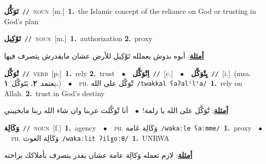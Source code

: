 \documentclass[10pt,a4paper,twoside]{article} %
\begin{document}
\begin{multicols}{2}
{\setlength\topsep{0pt}\textbf{\foreignlanguage{arabic}{تَوَكُّل}}\ {\color{gray}\texttt{//}\color{black}}\ \textsc{noun}\ [m.]\ \textbf{1.}~the Islamic concept of the reliance on God or trusting in God's plan\ } \vspace{2mm}

{\setlength\topsep{0pt}\textbf{\foreignlanguage{arabic}{تَوْكِيل}}\ {\color{gray}\texttt{//}\color{black}}\ \textsc{noun}\ [m.]\ \textbf{1.}~authorization  \textbf{2.}~proxy\  \begin{flushright}\color{gray}\foreignlanguage{arabic}{\textbf{\underline{\foreignlanguage{arabic}{أمثلة}}}: أبوه  بدوش يعملله تَوْكِيل للأرض عشان مايقدرش يتصرف فيها}\end{flushright}\color{black}} \vspace{2mm}

{\setlength\topsep{0pt}\textbf{\foreignlanguage{arabic}{تْوَكَّل}}\ {\color{gray}\texttt{//}\color{black}}\ \textsc{verb}\ [p.]\ \textbf{1.}~rely  \textbf{2.}~trust\ \ $\bullet$\ \ \setlength\topsep{0pt}\textbf{\foreignlanguage{arabic}{اِتْوَكَّل}}\ {\color{gray}\texttt{//}\color{black}}\ [c.]\ \ $\bullet$\ \ \setlength\topsep{0pt}\textbf{\foreignlanguage{arabic}{يِتْوَكَّل}}\ {\color{gray}\texttt{//}\color{black}}\ [i.]\ \color{gray}(msa. \foreignlanguage{arabic}{يعتمد}~\foreignlanguage{arabic}{\textbf{٢.}}  \foreignlanguage{arabic}{يَتَوكَّل}~\foreignlanguage{arabic}{\textbf{١.}})\color{black}\ \ $\bullet$\ \ \textsc{ph.} \color{gray} \foreignlanguage{arabic}{تْوَكَّل على الله}\color{black}\ {\color{gray}\texttt{/{\sffamily twakkal ʕaʔalˤlˤa}/}\color{black}}\ \textbf{1.}~rely on Allah.  \textbf{2.}~trust in God's destiny\  \begin{flushright}\color{gray}\foreignlanguage{arabic}{\textbf{\underline{\foreignlanguage{arabic}{أمثلة}}}: تْوَكَّل على الله يا زلمة!\ $\bullet$\ \  أنا تْوَكَّلت عربنا وان شاء الله ربنا مابخيبني}\end{flushright}\color{black}} \vspace{2mm}

{\setlength\topsep{0pt}\textbf{\foreignlanguage{arabic}{وَكَالِة}}\ {\color{gray}\texttt{//}\color{black}}\ \textsc{noun}\ [f.]\ \textbf{1.}~agency\ \ $\bullet$\ \ \textsc{ph.} \color{gray} \foreignlanguage{arabic}{وَكَالِة عَامة}\color{black}\ {\color{gray}\texttt{/{\sffamily wakaːle ʕaːmme}/}\color{black}}\ \textbf{1.}~proxy\ \ $\bullet$\ \ \textsc{ph.} \color{gray} \foreignlanguage{arabic}{وَكَالِة الغوث}\color{black}\ {\color{gray}\texttt{/{\sffamily wakaːlit ʔilɣoːθ}/}\color{black}}\ \textbf{1.}~UNRWA\  \begin{flushright}\color{gray}\foreignlanguage{arabic}{\textbf{\underline{\foreignlanguage{arabic}{أمثلة}}}: لازم تعمله وَكالِة عامة عشان يقدر يتصرف بأملاكك براحته}\end{flushright}\color{black}} \vspace{2mm}


\end{multicols}
\end{document}
